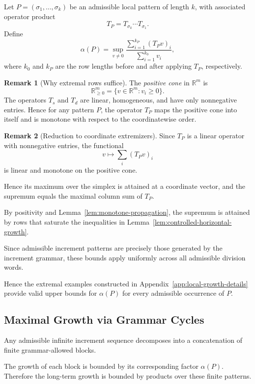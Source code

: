 \documentclass[12pt, oneside]{article}   	%
\numberwithin{equation}{section}          %
\theoremstyle{definition}
\newtheorem*{remark}{Remark}
\begin{document}
Let $P = (\sigma_1,\dots,\sigma_k)$ be an admissible local pattern of length $k$,
with associated operator product
\[
T_P = T_{\sigma_k}\cdots T_{\sigma_1}.
\]
Define
\[
\alpha(P)
= \sup_{v\neq 0}
\frac{\sum_{i=1}^{k_P} (T_P v)_i}{\sum_{i=1}^{k_0} v_i},
\]
where $k_0$ and $k_P$ are the row lengths before and after applying $T_P$, respectively.

\begin{remark}[Why extremal rows suffice]
The \emph{positive cone} in $\mathbb{R}^m$ is
\[
\mathbb{R}^m_{\ge 0} = \{v \in \mathbb{R}^m : v_i \ge 0\}.
\]
The operators $T_s$ and $T_d$ are linear, homogeneous, and have only
nonnegative entries.  Hence for any pattern $P$, the operator $T_P$ maps the
positive cone into itself and is monotone with respect to the coordinatewise
order.
\end{remark}

\begin{remark}[Reduction to coordinate extremizers]
Since $T_P$ is a linear operator with nonnegative entries, the functional
\[
v \mapsto \sum_i (T_P v)_i
\]
is linear and monotone on the positive cone.

Hence its maximum over the simplex is attained at a coordinate vector,
and the supremum equals the maximal column sum of $T_P$.
\end{remark}

By positivity and Lemma~\ref{lem:monotone-propagation},
the supremum is attained by rows that saturate the inequalities in
Lemma~\ref{lem:controlled-horizontal-growth}.

Since admissible increment patterns are precisely those generated by the
increment grammar, these bounds apply uniformly across all admissible
division words.

Hence the extremal examples constructed in
Appendix~\ref{app:local-growth-details} provide valid upper bounds for
$\alpha(P)$ for every admissible occurrence of $P$.


\subsection{Maximal Growth via Grammar Cycles}

Any admissible infinite increment sequence decomposes into a concatenation of
finite grammar-allowed blocks.

The growth of each block is bounded by its corresponding factor $\alpha(P)$.
Therefore the long-term growth is bounded by products over these finite patterns.
\end{document}
